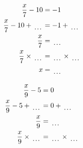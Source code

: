 \documentclass[12pt]{article}
\newcounter{minipagecount}
\begin{document}
\begin{multicols}{2}
\begin{minipage}[t]{0.45\textwidth}
    \raggedright %
    \begin{align*} %
        \frac{x}{7} - 10 &= -1\\
        \frac{x}{7} - 10 + \dotuline{\hspace{5mm}} &= -1 + \dotuline{\hspace{5mm}}\\
        \frac{x}{7} &= \dotuline{\hspace{5mm}}\\
        \frac{x}{7} \times\dotuline{\hspace{5mm}} &= \dotuline{\hspace{5mm}} \times\dotuline{\hspace{5mm}}\\
        x &= \dotuline{\hspace{5mm}}\\
    \end{align*}
\end{minipage} %
\noindent{(\theminipagecount)}\hspace{0.1mm} %
\begin{minipage}[t]{0.45\textwidth} %
    \vspace{-26pt}  %
    \raggedright %
    \begin{align*} %
        \frac{x}{9} - 5 &= 0\\
        \frac{x}{9} - 5 + \dotuline{\hspace{5mm}} &= 0 + \dotuline{\hspace{5mm}}\\
        \frac{x}{9} &= \dotuline{\hspace{5mm}}\\
        \frac{x}{9} \times\dotuline{\hspace{5mm}} &= \dotuline{\hspace{5mm}} \times\dotuline{\hspace{5mm}}\\

\end{align*}
\end{minipage}
\end{multicols}
\end{document}
